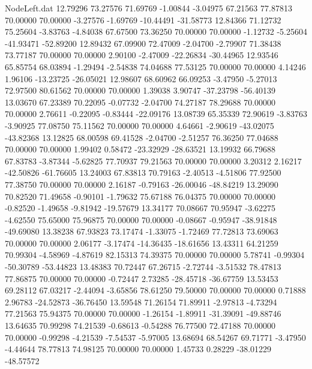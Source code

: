 \begin{filecontents}{NodeLeft.dat}
  12.79296   73.27576   71.69769    -1.00844   -3.04975   67.21563   77.87813   70.00000   70.00000   -3.27576   -1.69769  -10.44491  -31.58773
  12.84366   71.12732   75.25604    -3.83763   -4.84038   67.67500   73.36250   70.00000   70.00000   -1.12732   -5.25604  -41.93471  -52.89200
  12.89432   67.09900   72.47009    -2.04700   -2.79907   71.38438   73.77187   70.00000   70.00000    2.90100   -2.47009  -22.26834  -30.44965
  12.93546   65.85754   68.03894    -1.29494   -2.54838   74.04688   77.53125   70.00000   70.00000    4.14246    1.96106  -13.23725  -26.05021
  12.98607   68.60962   66.09253    -3.47950   -5.27013   72.97500   80.61562   70.00000   70.00000    1.39038    3.90747  -37.23798  -56.40139
  13.03670   67.23389   70.22095    -0.07732   -2.04700   74.27187   78.29688   70.00000   70.00000    2.76611   -0.22095   -0.83444  -22.09176
  13.08739   65.35339   72.90619    -3.83763   -3.90925   77.08750   75.11562   70.00000   70.00000    4.64661   -2.90619  -43.02075  -43.82368
  13.12825   68.00598   69.41528    -2.04700   -2.51257   76.36250   77.04688   70.00000   70.00000    1.99402    0.58472  -23.32929  -28.63521
  13.19932   66.79688   67.83783    -3.87344   -5.62825   77.70937   79.21563   70.00000   70.00000    3.20312    2.16217  -42.50826  -61.76605
  13.24003   67.83813   70.79163    -2.40513   -4.51806   77.92500   77.38750   70.00000   70.00000    2.16187   -0.79163  -26.00046  -48.84219
  13.29090   70.82520   71.49658    -0.90101   -1.79632   75.67188   76.04375   70.00000   70.00000   -0.82520   -1.49658   -9.81942  -19.57679
  13.34177   70.08667   70.95947    -3.62275   -4.62550   75.65000   75.96875   70.00000   70.00000   -0.08667   -0.95947  -38.91848  -49.69080
  13.38238   67.93823   73.17474    -1.33075   -1.72469   77.72813   73.69063   70.00000   70.00000    2.06177   -3.17474  -14.36435  -18.61656
  13.43311   64.21259   70.99304    -4.58969   -4.87619   82.15313   74.39375   70.00000   70.00000    5.78741   -0.99304  -50.30789  -53.44823
  13.48383   70.72447   67.26715    -2.72744   -3.51532   78.47813   77.86875   70.00000   70.00000   -0.72447    2.73285  -28.45718  -36.67759
  13.53453   69.28112   67.03217    -2.44094   -3.65856   78.61250   79.50000   70.00000   70.00000    0.71888    2.96783  -24.52873  -36.76450
  13.59548   71.26154   71.89911    -2.97813   -4.73294   77.21563   75.94375   70.00000   70.00000   -1.26154   -1.89911  -31.39091  -49.88746
  13.64635   70.99298   74.21539    -0.68613   -0.54288   76.77500   72.47188   70.00000   70.00000   -0.99298   -4.21539   -7.54537   -5.97005
  13.68694   68.54267   69.71771    -3.47950   -4.44644   78.77813   74.98125   70.00000   70.00000    1.45733    0.28229  -38.01229  -48.57572

\end{filecontents}
